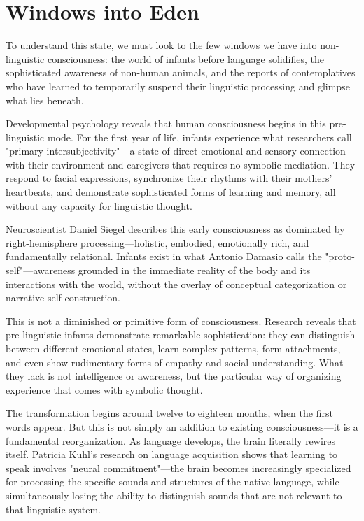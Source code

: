 \section{Windows into Eden}

To understand this state, we must look to the few windows we have into non-linguistic consciousness: the world of infants before language solidifies, the sophisticated awareness of non-human animals, and the reports of contemplatives who have learned to temporarily suspend their linguistic processing and glimpse what lies beneath.

Developmental psychology reveals that human consciousness begins in this pre-linguistic mode. For the first year of life, infants experience what researchers call "primary intersubjectivity"—a state of direct emotional and sensory connection with their environment and caregivers that requires no symbolic mediation. They respond to facial expressions, synchronize their rhythms with their mothers' heartbeats, and demonstrate sophisticated forms of learning and memory, all without any capacity for linguistic thought.

Neuroscientist Daniel Siegel describes this early consciousness as dominated by right-hemisphere processing—holistic, embodied, emotionally rich, and fundamentally relational. Infants exist in what Antonio Damasio calls the "proto-self"—awareness grounded in the immediate reality of the body and its interactions with the world, without the overlay of conceptual categorization or narrative self-construction.

This is not a diminished or primitive form of consciousness. Research reveals that pre-linguistic infants demonstrate remarkable sophistication: they can distinguish between different emotional states, learn complex patterns, form attachments, and even show rudimentary forms of empathy and social understanding. What they lack is not intelligence or awareness, but the particular way of organizing experience that comes with symbolic thought.

The transformation begins around twelve to eighteen months, when the first words appear. But this is not simply an addition to existing consciousness—it is a fundamental reorganization. As language develops, the brain literally rewires itself. Patricia Kuhl's research on language acquisition shows that learning to speak involves "neural commitment"—the brain becomes increasingly specialized for processing the specific sounds and structures of the native language, while simultaneously losing the ability to distinguish sounds that are not relevant to that linguistic system.

